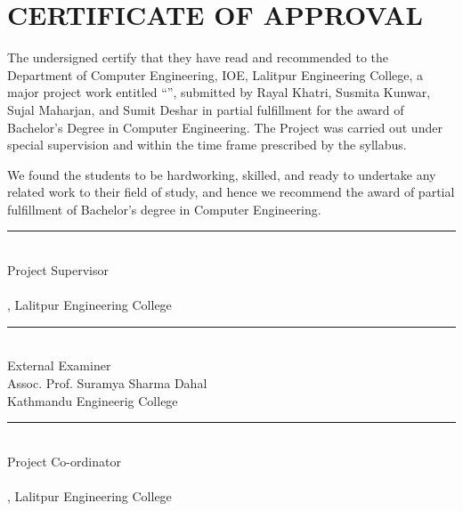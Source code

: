 \section*{CERTIFICATE OF APPROVAL}
\begingroup

The undersigned certify that they have read and recommended to the Department of Computer Engineering, IOE, Lalitpur Engineering College, a major project work entitled ``\textbf{\themaintitle}'', submitted by Rayal Khatri, Susmita Kunwar, Sujal Maharjan, and Sumit Deshar in partial fulfillment for the award of Bachelor’s Degree in Computer Engineering. The Project was carried out under special supervision and within the time frame prescribed by the syllabus.

We found the students to be hardworking, skilled, and ready to undertake any related work to their field of study, and hence we recommend the award of partial fulfillment of Bachelor’s degree in Computer Engineering.

\vspace{.7cm}


\rule{0.62\textwidth}{0.4pt}\\
Project Supervisor\\
\thesupervisor\\
\thedepartment, Lalitpur Engineering College



\vspace{.7cm}

\rule{0.62\textwidth}{0.4pt}\\
External Examiner\\
Assoc. Prof. Suramya Sharma Dahal \\
Kathmandu Engineerig College

\vspace{.7cm}


\rule{0.62\textwidth}{0.4pt}\\
Project Co-ordinator\\
\theprogramcoordinator\\
\thedepartment, Lalitpur Engineering College





\vspace{0.5cm}

\noindent \thedate
\endgroup